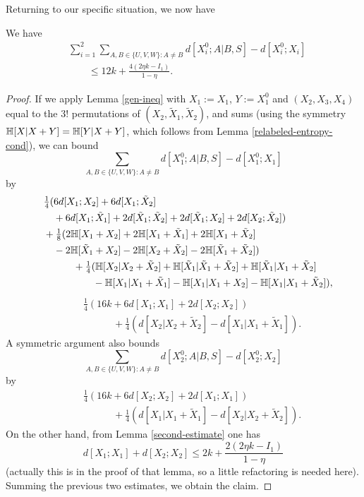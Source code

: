 Returning to our specific situation, we now have

\begin{lemma}\label{dist-diff-bound}\label{dist_diff_bound} We have
\begin{align*}  &\sum_{i=1}^2 \sum_{A,B \in \{U,V,W\}: A \neq B}  d[X_i^0;A|B, S] - d[X_i^0;X_i]\\
&\qquad \leq 12 k + \frac{4(2 \eta k - I_1)}{1-\eta}.
\end{align*}
\end{lemma}

\begin{proof}  If we apply Lemma \ref{gen-ineq} with $X_1:=X_1$, $Y:=X_1^0$ and $(X_2,X_3,X_4)$ equal to the $3!$ permutations of $(X_2,\tilde X_1,\tilde X_2)$, and sums (using the symmetry $\mathbb{H}[X|X+Y] = \mathbb{H}[Y|X+Y]$, which follows from Lemma \ref{relabeled-entropy-cond}), we can bound
$$ \sum_{A,B \in \{U,V,W\}: A \neq B}  d[X_1^0;A|B, S] - d[X_1^0;X_1]$$
by
\begin{align*}
  &\quad \tfrac{1}{4} (6d[X_1;X_2] + 6d[X_1;\tilde X_2]\\
  &\qquad + 6d[X_1;\tilde X_1] + 2d[\tilde X_1;\tilde X_2] + 2 d[\tilde X_1;X_2] + 2d[X_2;\tilde X_2])\\
  &\quad + \tfrac{1}{8} (2\mathbb{H}[X_1+X_2] + 2\mathbb{H}[X_1+\tilde X_1] + 2 \mathbb{H}[X_1+\tilde X_2] \\
  &\qquad - 2\mathbb{H}[\tilde X_1+X_2] - 2\mathbb{H}[X_2+\tilde X_2] - 2\mathbb{H}[\tilde X_1+\tilde X_2])\\
  &\qquad \qquad + \tfrac{1}{4} (\mathbb{H}[X_2|X_2+\tilde X_2] + \mathbb{H}[\tilde X_1|\tilde X_1+\tilde X_2] + \mathbb{H}[\tilde X_1|X_1+\tilde X_2] \\
  &\qquad \qquad \qquad - \mathbb{H}[X_1|X_1+\tilde X_1] - \mathbb{H}[X_1|X_1+X_2] - \mathbb{H}[X_1|X_1+\tilde X_2]),
\end{align*}
\begin{align*}
  &\quad \tfrac{1}{4} (16k + 6d[X_1;X_1] + 2d[X_2;X_2])\\
  &\qquad \qquad + \tfrac{1}{4} (d[X_2|X_2+\tilde X_2] - d[X_1|X_1+\tilde X_1]).
\end{align*}
A symmetric argument also bounds
$$ \sum_{A,B \in \{U,V,W\}: A \neq B}  d[X_2^0;A|B, S] - d[X_2^0;X_2]$$
by
\begin{align*}
  &\quad \tfrac{1}{4} (16k + 6d[X_2;X_2] + 2d[X_1;X_1])\\
  &\qquad \qquad + \tfrac{1}{4} (d[X_1|X_1+\tilde X_1] - d[X_2|X_2+\tilde X_2]).
\end{align*}
On the other hand, from Lemma \ref{second-estimate} one has
$$ d[X_1;X_1] + d[X_2;X_2] \leq 2 k + \frac{2(2 \eta k - I_1)}{1-\eta}$$
(actually this is in the proof of that lemma, so a little refactoring is needed here).  Summing the previous two estimates, we obtain the claim.
\end{proof}

